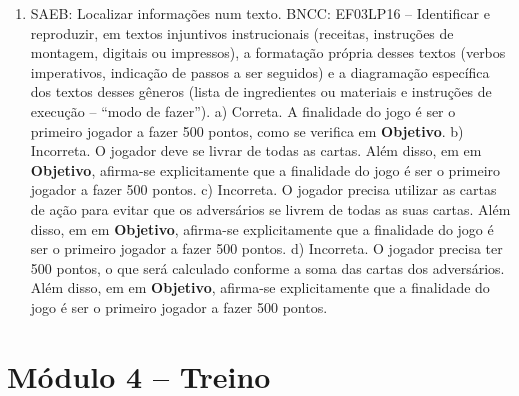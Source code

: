 \begin{enumerate}
\item
SAEB: Localizar informações num texto.
BNCC: EF03LP16 -- Identificar e reproduzir, em textos injuntivos
instrucionais (receitas, instruções de montagem, digitais ou impressos),
a formatação própria desses textos (verbos imperativos, indicação de
passos a ser seguidos) e a diagramação específica dos textos desses
gêneros (lista de ingredientes ou materiais e instruções de execução --
``modo de fazer'').
a) Correta. A finalidade do jogo é ser o primeiro jogador a fazer 500
pontos, como se verifica em \textbf{Objetivo}.
b) Incorreta. O jogador deve se livrar de todas as cartas. Além disso, em 
em \textbf{Objetivo}, afirma-se explicitamente que a finalidade do jogo
é ser o primeiro jogador a fazer 500 pontos.  
c) Incorreta. O jogador precisa utilizar as cartas de ação para evitar
que os adversários se livrem de todas as suas cartas. Além disso, em 
em \textbf{Objetivo}, afirma-se explicitamente que a finalidade do jogo
é ser o primeiro jogador a fazer 500 pontos. 
d) Incorreta. O jogador precisa ter 500 pontos, o que será calculado
conforme a soma das cartas dos adversários. Além disso, em 
em \textbf{Objetivo}, afirma-se explicitamente que a finalidade do jogo
é ser o primeiro jogador a fazer 500 pontos.
\end{enumerate}

\section*{Módulo 4 – Treino}

